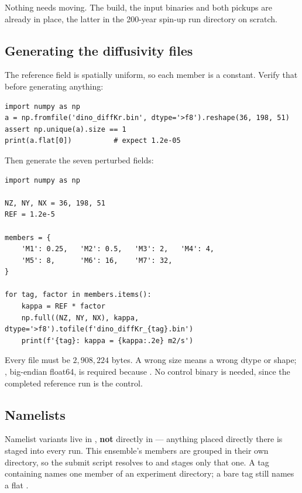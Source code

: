 Nothing needs moving. The build, the input binaries and both pickups are already
in place, the latter in the 200-year spin-up run directory on scratch.

\subsection{Generating the diffusivity files}

The reference field is spatially uniform, so each member is a constant. Verify
that before generating anything:

\begin{footnotesize}
\begin{verbatim}
import numpy as np
a = np.fromfile('dino_diffKr.bin', dtype='>f8').reshape(36, 198, 51)
assert np.unique(a).size == 1
print(a.flat[0])          # expect 1.2e-05
\end{verbatim}
\end{footnotesize}

Then generate the seven perturbed fields:

\begin{footnotesize}
\begin{verbatim}
import numpy as np

NZ, NY, NX = 36, 198, 51
REF = 1.2e-5

members = {
    'M1': 0.25,   'M2': 0.5,   'M3': 2,   'M4': 4,
    'M5': 8,      'M6': 16,    'M7': 32,
}

for tag, factor in members.items():
    kappa = REF * factor
    np.full((NZ, NY, NX), kappa, dtype='>f8').tofile(f'dino_diffKr_{tag}.bin')
    print(f'{tag}: kappa = {kappa:.2e} m2/s')
\end{verbatim}
\end{footnotesize}

Every file must be $2{,}908{,}224$ bytes. A wrong size means a wrong dtype or
shape; , big-endian float64, is required because
. No control binary is needed, since the completed
reference run is the control.

\subsection{Namelists}
\label{app:namelists}

Namelist variants live in , \textbf{not} directly in
 --- anything placed directly there is staged into every run.
This ensemble's members are grouped in their own directory, so the submit
script resolves  to
 and stages only that one. A tag
containing \code{/} names one member of an experiment directory; a bare tag
still names a flat .


